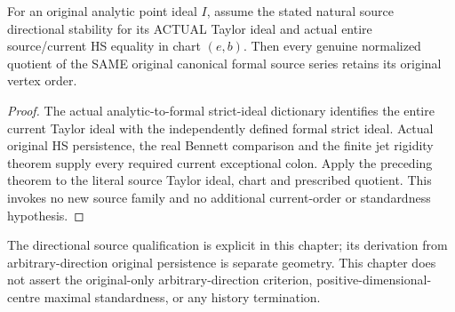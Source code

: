 \begin{theorem}
\label{hir:actual-original-directional-persistent-canonical-orders-qualified}
\leanok
For an original analytic point ideal $I$, assume the stated natural
source directional stability for its ACTUAL Taylor ideal and actual entire
source/current HS equality in chart $(e,b)$. Then every genuine normalized
quotient of the SAME original canonical formal source series retains its
original vertex order.
\end{theorem}
\begin{proof}
The actual analytic-to-formal strict-ideal dictionary identifies the entire
current Taylor ideal with the independently defined formal strict ideal.
Actual original HS persistence, the real Bennett comparison and the finite
jet rigidity theorem supply every required current exceptional colon.
Apply the preceding theorem to the literal source Taylor ideal, chart and
prescribed quotient. This invokes no new source family and no additional
current-order or standardness hypothesis.
\end{proof}

The directional source qualification is explicit in this chapter; its
derivation from arbitrary-direction original persistence is separate geometry.
This chapter does not assert the original-only arbitrary-direction criterion,
positive-dimensional-centre maximal standardness, or any history termination.
